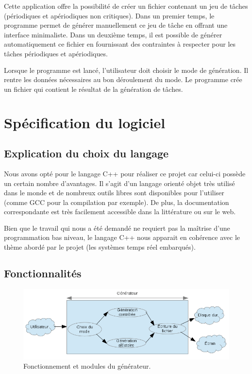 	Cette application offre la possibilité de créer un fichier contenant un jeu de tâches (périodiques et apériodiques non critiques).
	Dans un premier temps, le programme permet de générer manuellement ce jeu de tâche en offrant une interface minimaliste.
	Dans un deuxième temps, il est possible de générer automatiquement ce fichier en fournissant des contraintes à respecter pour les tâches périodiques et apériodiques.
	
	
	Lorsque le programme est lancé, l’utilisateur doit choisir le mode de génération. Il rentre les données nécessaires au bon déroulement du mode. Le programme crée un fichier qui contient le résultat de la génération de tâches.


	\section{Spécification du logiciel}

		\subsection{Explication du choix du langage}
	
			\label{sec:langage}
			Nous avons opté pour le langage C++ pour réaliser ce projet car celui-ci possède un certain nombre d'avantages. Il s'agit d'un langage orienté objet très utilisé dans le monde et de nombreux outils libres sont disponibles pour l'utiliser (comme GCC pour la compilation par exemple). De plus, la documentation correspondante est très facilement accessible dans la littérature ou sur le web.
		
			Bien que le travail qui nous a été demandé ne requiert pas la maîtrise d'une programmation bas niveau, le langage C++ nous apparait en cohérence avec le thème abordé par le projet (les systèmes temps réel embarqués).
\newpage
		\subsection{Fonctionnalités}
		
			\begin{figure}
				\centering
				\includegraphics[scale=0.9]{img/schema_gen.png}
				\caption{Fonctionnement et modules du générateur.}
			\end{figure}
			\FloatBarrier
		    
